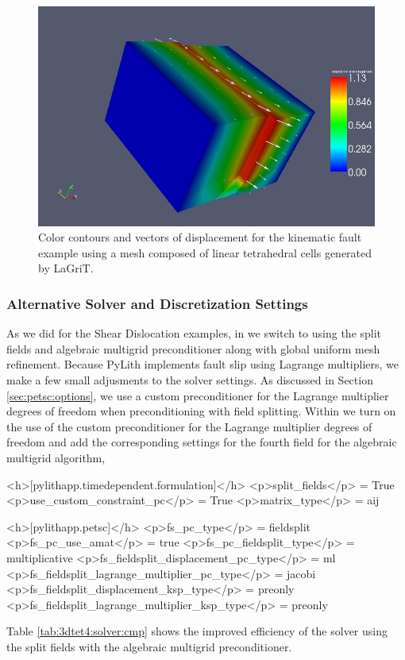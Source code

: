 \begin{figure}
  \includegraphics[scale=0.45]{examples/figs/3dtet4_dislocation}
  \caption{Color contours and vectors of displacement for the
    kinematic fault example using a mesh composed of linear
    tetrahedral cells generated by LaGriT.}
  \label{fig:3dtet:dislocation}
\end{figure}


\subsubsection{Alternative Solver and Discretization Settings}

As we did for the Shear Dislocation examples, in 
we switch to using the split fields and algebraic multigrid preconditioner
along with global uniform mesh refinement. Because PyLith implements
fault slip using Lagrange multipliers, we make a few small adjusments
to the solver settings. As discussed in Section \vref{sec:petsc:options},
we use a custom preconditioner for the Lagrange multiplier degrees
of freedom when preconditioning with field splitting. Within 
we turn on the use of the custom preconditioner for the Lagrange multiplier
degrees of freedom and add the corresponding settings for the fourth
field for the algebraic multigrid algorithm,
\begin{cfg}
<h>[pylithapp.timedependent.formulation]</h>
<p>split_fields</p> = True
<p>use_custom_constraint_pc</p> = True
<p>matrix_type</p> = aij

<h>[pylithapp.petsc]</h>
<p>fs_pc_type</p> = fieldsplit
<p>fs_pc_use_amat</p> = true
<p>fs_pc_fieldsplit_type</p> = multiplicative
<p>fs_fieldsplit_displacement_pc_type</p> = ml
<p>fs_fieldsplit_lagrange_multiplier_pc_type</p> = jacobi
<p>fs_fieldsplit_displacement_ksp_type</p> = preonly
<p>fs_fieldsplit_lagrange_multiplier_ksp_type</p> = preonly
\end{cfg}
Table \vref{tab:3dtet4:solver:cmp} shows the improved efficiency of
the solver using the split fields with the algebraic multigrid preconditioner.


